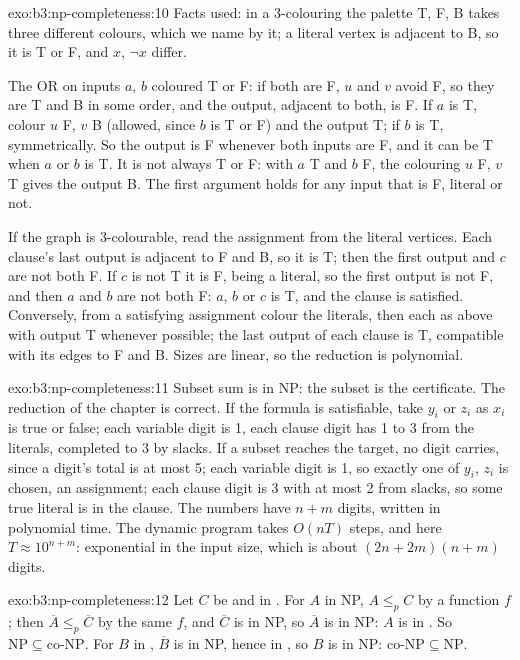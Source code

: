 \begin{solution}{exo:b3:np-completeness:10}
Facts used: in a 3-colouring the palette T, F, B takes three different colours, which we name by it; a literal vertex is adjacent to B, so it is T or F, and $x$, $\neg x$ differ.

The OR  on inputs $a$, $b$ coloured T or F: if both are F, $u$ and $v$ avoid F, so they are T and B in some order, and the output, adjacent to both, is F. If $a$ is T, colour $u$ F, $v$ B (allowed, since $b$ is T or F) and the output T; if $b$ is T, symmetrically. So the output is F whenever both inputs are F, and it can be T when $a$ or $b$ is T. It is not always T or F: with $a$ T and $b$ F, the colouring $u$ F, $v$ T gives the output B. The first argument holds for any input that is F, literal or not.

If the graph is 3-colourable, read the assignment from the literal vertices. Each clause's last output is adjacent to F and B, so it is T; then the first output and $c$ are not both F. If $c$ is not T it is F, being a literal, so the first output is not F, and then $a$ and $b$ are not both F: $a$, $b$ or $c$ is T, and the clause is satisfied. Conversely, from a satisfying assignment colour the literals, then each  as above with output T whenever possible; the last output of each clause is T, compatible with its edges to F and B. Sizes are linear, so the reduction is polynomial.
\end{solution}

\begin{solution}{exo:b3:np-completeness:11}
Subset sum is in NP: the subset is the certificate. The reduction of the chapter is correct. If the formula is satisfiable, take $y_i$ or $z_i$ as $x_i$ is true or false; each variable digit is 1, each clause digit has 1 to 3 from the literals, completed to 3 by slacks. If a subset reaches the target, no digit carries, since a digit's total is at most 5; each variable digit is 1, so exactly one of $y_i$, $z_i$ is chosen, an assignment; each clause digit is 3 with at most 2 from slacks, so some true literal is in the clause. The numbers have $n + m$ digits, written in polynomial time. The dynamic program takes $O(nT)$ steps, and here $T \approx 10^{n + m}$: exponential in the input size, which is about $(2n + 2m)(n + m)$ digits.
\end{solution}

\begin{solution}{exo:b3:np-completeness:12}
Let $C$ be  and in . For $A$ in NP, $A \le_p C$ by a function $f$; then $\overline{A} \le_p \overline{C}$ by the same $f$, and $\overline{C}$ is in NP, so $\overline{A}$ is in NP: $A$ is in . So $\mathrm{NP} \subseteq \mathrm{co\text{-}NP}$. For $B$ in , $\overline{B}$ is in NP, hence in , so $B$ is in NP: $\mathrm{co\text{-}NP} \subseteq \mathrm{NP}$.
\end{solution}

